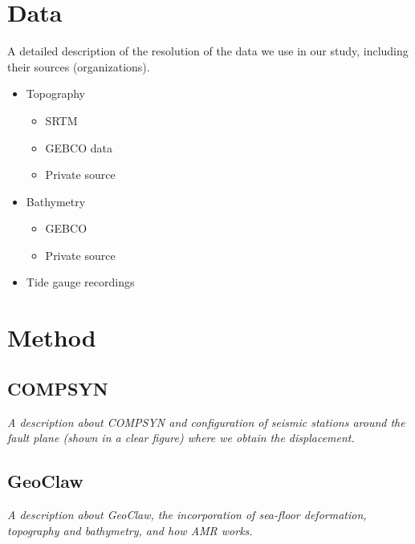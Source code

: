 \documentclass[preprint,review,12pt]{elsarticle}
\newcommand{\geoclaw}{{\sc GeoClaw}\xspace}
\newcommand{\compsyn}{COMPSYN\xspace}
\begin{document}
\section{Data} \label{sec:data}

A detailed description of the resolution of the data we use in our study, including their sources (organizations).
\begin{itemize}
  \item Topography
  \begin{itemize}
    \item SRTM
    \item GEBCO data
    \item Private source
  \end{itemize}
  \item Bathymetry
  \begin{itemize}
    \item GEBCO
    \item Private source
  \end{itemize}
  \item Tide gauge recordings
\end{itemize}

\section{Method} \label{sec:method}

\subsection{\compsyn} \label{sub:compsyn}
\emph{A description about \compsyn and configuration of seismic stations around the fault plane (shown in a clear figure) where we obtain the displacement.}

\subsection{\geoclaw} \label{sub:geoclaw}

\emph{A description about GeoClaw, the incorporation of sea-floor deformation, topography and bathymetry, and how AMR works.}
\end{document}
